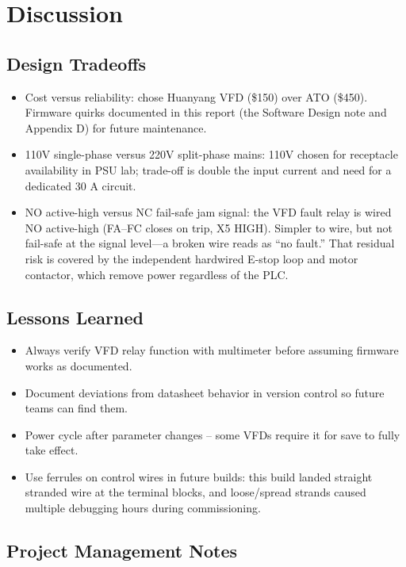 \documentclass[hidelinks,12pt]{article}
\begin{document}
\section{Discussion}

\subsection{Design Tradeoffs}
\begin{itemize}
    \item Cost versus reliability: chose Huanyang VFD (\$150) over ATO (\$450). Firmware quirks documented in this report (the Software Design note and Appendix D) for future maintenance.
    \item 110V single-phase versus 220V split-phase mains: 110V chosen for receptacle availability in PSU lab; trade-off is double the input current and need for a dedicated 30 A circuit.
    \item NO active-high versus NC fail-safe jam signal: the VFD fault relay is wired NO active-high (FA--FC closes on trip, X5 HIGH). Simpler to wire, but not fail-safe at the signal level---a broken wire reads as ``no fault.'' That residual risk is covered by the independent hardwired E-stop loop and motor contactor, which remove power regardless of the PLC.
\end{itemize}

\subsection{Lessons Learned}
\begin{itemize}
    \item Always verify VFD relay function with multimeter before assuming firmware works as documented.
    \item Document deviations from datasheet behavior in version control so future teams can find them.
    \item Power cycle after parameter changes -- some VFDs require it for save to fully take effect.
    \item Use ferrules on control wires in future builds: this build landed straight stranded wire at the terminal blocks, and loose/spread strands caused multiple debugging hours during commissioning.
\end{itemize}

\subsection{Project Management Notes}
\end{document}
